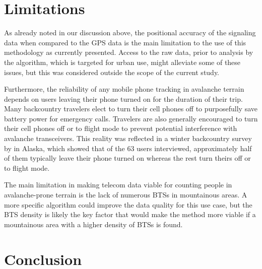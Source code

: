 \documentclass[authordate,empirical]{jote-new-article}
\begin{document}
\newpage
\section{Limitations}



As already noted in our discussion above, the positional accuracy of the signaling data when compared to the GPS data is the main limitation to the use of this methodology as currently presented. Access to the raw data, prior to analysis by the algorithm, which is targeted for urban use, might alleviate some of these issues, but this was considered outside the scope of the current study.







Furthermore, the reliability of any mobile phone tracking in avalanche terrain depends on users leaving their phone turned on for the duration of their trip. Many backcountry travelers elect to turn their cell phones off to purposefully save battery power for emergency calls. Travelers are also generally encouraged to turn their cell phones off or to flight mode to prevent potential interference with avalanche transceivers. This reality was reflected in a winter backcountry survey by \textcite{Ortega2018} in Alaska, which showed that of the 63 users interviewed, approximately half of them typically leave their phone turned on whereas the rest turn theirs off or to flight mode.







The main limitation in making telecom data viable for counting people in avalanche-prone terrain is the lack of numerous BTSs in mountainous areas. A more specific algorithm could improve the data quality for this use case, but the BTS density is likely the key factor that would make the method more viable if a mountainous area with a higher density of BTSs is found.





\section{Conclusion}
\end{document}
